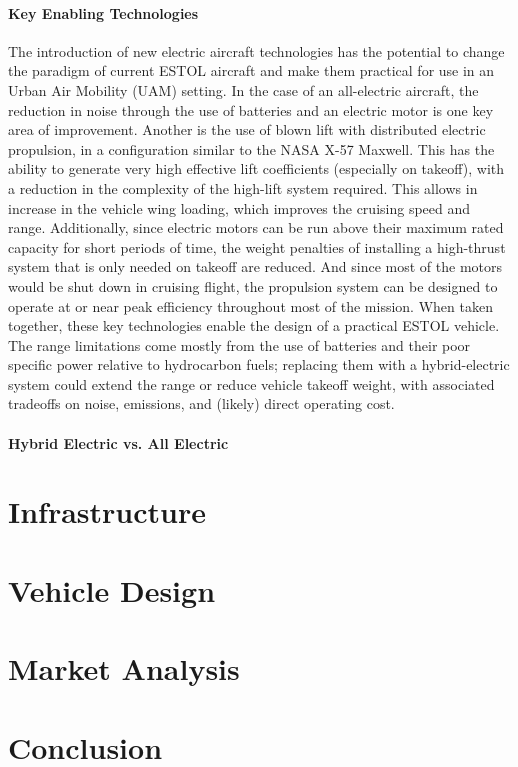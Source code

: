 \documentclass[]{aiaa-tc}%
\begin{document}
\paragraph{Key Enabling Technologies} The introduction of new electric aircraft technologies has the potential to change the paradigm of current ESTOL aircraft and make them practical for use in an Urban Air Mobility (UAM) setting.   In the case of an all-electric aircraft, the reduction in noise through the use of batteries and an electric motor is one key area of improvement.  Another is the use of blown lift with distributed electric propulsion, in a configuration similar to the NASA X-57 Maxwell.  This has the ability to generate very high effective lift coefficients (especially on takeoff), with a reduction in the complexity of the high-lift system required.  This allows in increase in the vehicle wing loading, which improves the cruising speed and range.  
Additionally, since electric motors can be run above their maximum rated capacity for short periods of time, the weight penalties of installing a high-thrust system that is only needed on takeoff are reduced.  And since most of the motors would be shut down in cruising flight, the propulsion system can be designed to operate at or near peak efficiency throughout most of the mission.  When taken together, these key technologies enable the design of a practical ESTOL vehicle.  The range limitations come mostly from the use of batteries and their poor specific power relative to hydrocarbon fuels; replacing them with a hybrid-electric system could extend the range or reduce vehicle takeoff weight, with associated tradeoffs on noise, emissions, and (likely) direct operating cost.  
 
\paragraph{Hybrid Electric vs. All Electric} 



\section{Infrastructure}

\section{Vehicle Design}

\section{Market Analysis}

\section{Conclusion}



\end{document}
